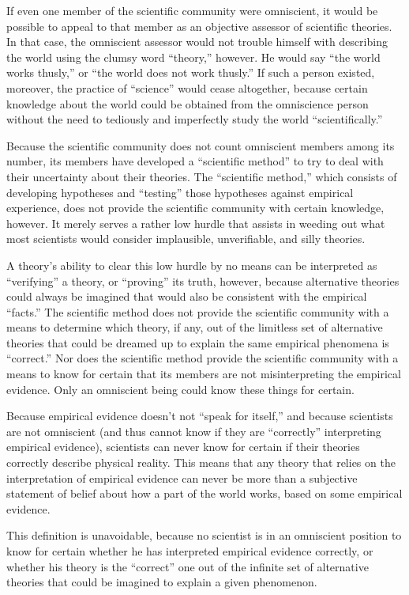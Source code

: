 If even one member of the scientific community were omniscient, it would be possible to appeal to that member as an objective assessor of scientific theories. In that case, the omniscient assessor would not trouble himself with describing the world using the clumsy word ``theory,'' however. He would say ``the world works thusly,'' or ``the world does not work thusly.'' If such a person existed, moreover, the practice of ``science'' would cease altogether, because certain knowledge about the world could be obtained from the omniscience person without the need to tediously and imperfectly study the world ``scientifically.''

Because the scientific community does not count omniscient members among its number, its members have developed a ``scientific method'' to try to deal with their uncertainty about their theories. The ``scientific method,'' which consists of developing hypotheses and ``testing'' those hypotheses against empirical experience, does not provide the scientific community with certain knowledge, however. It merely serves a rather low hurdle that assists in weeding out what most scientists would consider implausible, unverifiable, and silly theories.

A theory’s ability to clear this low hurdle by no means can be interpreted as ``verifying'' a theory, or ``proving'' its truth, however, because alternative theories could always be imagined that would also be consistent with the empirical ``facts.''  The scientific method does not provide the scientific community with a means to determine which theory, if any, out of the limitless set of alternative theories that could be dreamed up to explain the same empirical phenomena is ``correct.''  Nor does the scientific method provide the scientific community with a means to know for certain that its members are not misinterpreting the empirical evidence. Only an omniscient being could know these things for certain.

Because empirical evidence doesn’t not ``speak for itself,'' and because scientists are not omniscient (and thus cannot know if they are ``correctly'' interpreting empirical evidence), scientists can never know for certain if their theories correctly describe physical reality. This means that any theory that relies on the interpretation of empirical evidence can never be more than a subjective statement of belief about how a part of the world works, based on some empirical evidence.

This definition is unavoidable, because no scientist is in an omniscient position to know for certain whether he has interpreted empirical evidence correctly, or whether his theory is the ``correct'' one out of the infinite set of alternative theories that could be imagined to explain a given phenomenon.

